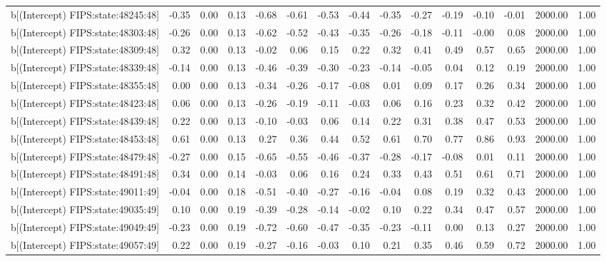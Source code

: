 \begin{table}[ht]
\begin{tabular}{rrrrrrrrrrrrrrr}
  b[(Intercept) FIPS:state:48245:48] & -0.35 & 0.00 & 0.13 & -0.68 & -0.61 & -0.53 & -0.44 & -0.35 & -0.27 & -0.19 & -0.10 & -0.01 & 2000.00 & 1.00 \\ 
  b[(Intercept) FIPS:state:48303:48] & -0.26 & 0.00 & 0.13 & -0.62 & -0.52 & -0.43 & -0.35 & -0.26 & -0.18 & -0.11 & -0.00 & 0.08 & 2000.00 & 1.00 \\ 
  b[(Intercept) FIPS:state:48309:48] & 0.32 & 0.00 & 0.13 & -0.02 & 0.06 & 0.15 & 0.22 & 0.32 & 0.41 & 0.49 & 0.57 & 0.65 & 2000.00 & 1.00 \\ 
  b[(Intercept) FIPS:state:48339:48] & -0.14 & 0.00 & 0.13 & -0.46 & -0.39 & -0.30 & -0.23 & -0.14 & -0.05 & 0.04 & 0.12 & 0.19 & 2000.00 & 1.00 \\ 
  b[(Intercept) FIPS:state:48355:48] & 0.00 & 0.00 & 0.13 & -0.34 & -0.26 & -0.17 & -0.08 & 0.01 & 0.09 & 0.17 & 0.26 & 0.34 & 2000.00 & 1.00 \\ 
  b[(Intercept) FIPS:state:48423:48] & 0.06 & 0.00 & 0.13 & -0.26 & -0.19 & -0.11 & -0.03 & 0.06 & 0.16 & 0.23 & 0.32 & 0.42 & 2000.00 & 1.00 \\ 
  b[(Intercept) FIPS:state:48439:48] & 0.22 & 0.00 & 0.13 & -0.10 & -0.03 & 0.06 & 0.14 & 0.22 & 0.31 & 0.38 & 0.47 & 0.53 & 2000.00 & 1.00 \\ 
  b[(Intercept) FIPS:state:48453:48] & 0.61 & 0.00 & 0.13 & 0.27 & 0.36 & 0.44 & 0.52 & 0.61 & 0.70 & 0.77 & 0.86 & 0.93 & 2000.00 & 1.00 \\ 
  b[(Intercept) FIPS:state:48479:48] & -0.27 & 0.00 & 0.15 & -0.65 & -0.55 & -0.46 & -0.37 & -0.28 & -0.17 & -0.08 & 0.01 & 0.11 & 2000.00 & 1.00 \\ 
  b[(Intercept) FIPS:state:48491:48] & 0.34 & 0.00 & 0.14 & -0.03 & 0.06 & 0.16 & 0.24 & 0.33 & 0.43 & 0.51 & 0.61 & 0.71 & 2000.00 & 1.00 \\ 
  b[(Intercept) FIPS:state:49011:49] & -0.04 & 0.00 & 0.18 & -0.51 & -0.40 & -0.27 & -0.16 & -0.04 & 0.08 & 0.19 & 0.32 & 0.43 & 2000.00 & 1.00 \\ 
  b[(Intercept) FIPS:state:49035:49] & 0.10 & 0.00 & 0.19 & -0.39 & -0.28 & -0.14 & -0.02 & 0.10 & 0.22 & 0.34 & 0.47 & 0.57 & 2000.00 & 1.00 \\ 
  b[(Intercept) FIPS:state:49049:49] & -0.23 & 0.00 & 0.19 & -0.72 & -0.60 & -0.47 & -0.35 & -0.23 & -0.11 & 0.00 & 0.13 & 0.27 & 2000.00 & 1.00 \\ 
  b[(Intercept) FIPS:state:49057:49] & 0.22 & 0.00 & 0.19 & -0.27 & -0.16 & -0.03 & 0.10 & 0.21 & 0.35 & 0.46 & 0.59 & 0.72 & 2000.00 & 1.00 \\ 

\end{tabular}
\end{table}

